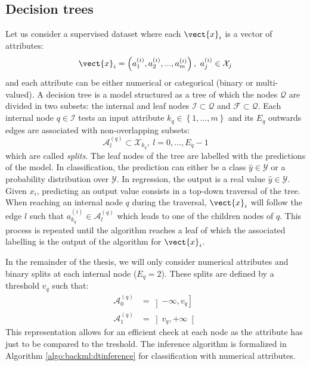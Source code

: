 \subsection{Decision trees}
\label{ssec:backml:dt}

Let us consider a supervised dataset where each $\vect{x}_i$ is a vector of attributes:
\begin{equation}
\label{eqn:backml:dt:vectattributes}
\vect{x}_i = \left(a^{(i)}_1, a^{(i)}_2, ..., a^{(i)}_m\right),~a^{(i)}_j \in \mathcal{X}_j
\end{equation}
and each attribute can be either numerical or categorical (binary or multi-valued). A decision tree is a model structured as a tree of which the nodes $\mathcal{Q}$ are divided in two subsets: the internal and leaf nodes $\mathcal{I} \subset \mathcal{Q}$ and $\mathcal{F} \subset \mathcal{Q}$. Each internal node $q \in \mathcal{I}$ tests an input attribute $k_q \in \left\{1,...,m\right\}$ and its $E_q$ outwards edges are associated with non-overlapping subsets:
\begin{equation}
\label{eqn:backml:dt:splitsgeneric}
\mathcal{A}^{(q)}_l \subset \mathcal{X}_{k_q},~l = 0,...,E_q-1
\end{equation}
which are called \textit{splits}. The leaf nodes of the tree are labelled with the predictions of the model. In classification, the prediction can either be a class $\hat{y} \in \mathcal{Y}$ or a probability distribution over $\mathcal{Y}$. In regression, the output is a real value $\hat{y} \in \mathcal{Y}$. Given $x_i$, predicting an output value consists in a top-down traversal of the tree. When reaching an internal node $q$ during the traversal, $\vect{x}_i$ will follow the edge $l$ such that $a^{(i)}_{k_q} \in \mathcal{A}^{(q)}_l$ which leads to one of the children nodes of $q$. This process is repeated until the algorithm reaches a leaf of which the associated labelling is the output of the algorithm for $\vect{x}_i$. 

In the remainder of the thesis, we will only consider numerical attributes and binary splits at each internal node ($E_q = 2$). These splits are defined by a threshold $v_q$ such that:
\begin{align}
\label{eqn:backml:dt:splitsbinary}
\mathcal{A}^{(q)}_0 &= \left]-\infty, v_q\right]\\
\mathcal{A}^{(q)}_1 &= \left]v_q, +\infty\right[
\end{align}
This representation allows for an efficient check at each node as the attribute has just to be compared to the treshold. The inference algorithm is formalized in Algorithm \ref{algo:backml:dtinference} for classification with numerical attributes. 

